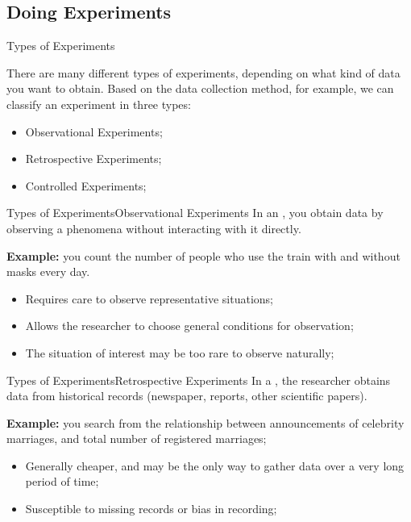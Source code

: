 \documentclass{beamer}
\begin{document}
\begin{CJK}{UTF8}{ipxm}
\section{Doing Experiments}
\begin{frame}{Types of Experiments}

  There are many different types of experiments, depending on what kind of data you want to obtain. Based on the data collection method, for example, we can classify an experiment in three types:
  \bigskip

  \begin{itemize}
    \item Observational Experiments;
    \item Retrospective Experiments;
    \item Controlled Experiments;
  \end{itemize}
\end{frame}

\begin{frame}{Types of Experiments}{Observational Experiments}
  In an , you obtain data by observing a phenomena without interacting with it directly.
  \bigskip

  {\bf Example:} you count the number of people who use the train with and without masks every day.
  \bigskip

  \begin{itemize}
    \item Requires care to observe representative situations;
    \item Allows the researcher to choose general conditions for observation;
    \item The situation of interest may be too rare to observe naturally;
  \end{itemize}
\end{frame}

\begin{frame}{Types of Experiments}{Retrospective Experiments}
  In a , the researcher obtains data from historical records (newspaper, reports, other scientific papers).\bigskip

  {\bf Example:} you search from the relationship between announcements of celebrity marriages, and total number of registered marriages;\bigskip

  \begin{itemize}
    \item Generally cheaper, and may be the only way to gather data over a very long period of time;
    \item Susceptible to missing records or bias in recording;
  \end{itemize}
\end{frame}


\end{CJK}
\end{document}
